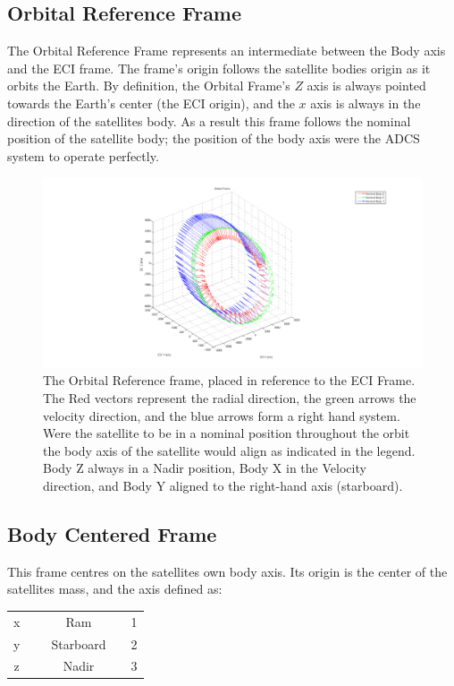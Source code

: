 \documentclass[12pt,a4paper]{article}
\begin{document}
\subsection{Orbital Reference Frame}
The Orbital Reference Frame represents an intermediate between the Body axis and the ECI frame. The frame's origin follows the satellite bodies origin as it orbits the Earth. By definition, the Orbital Frame's $Z$ axis is always pointed towards the Earth's center (the ECI origin), and the $x$ axis is always in the direction of the satellites body. As a result this frame follows the nominal position of the satellite body; the position of the body axis were the ADCS system to operate perfectly.

\begin{figure}[h!]
	\includegraphics[scale=0.25]{OrbitalFrame.png}
	\caption{The Orbital Reference frame, placed in reference to the ECI Frame. The Red vectors represent the radial direction, the green arrows the velocity direction, and the blue arrows form a right hand system. Were the satellite to be in a nominal position throughout the orbit the body axis of the satellite would align as indicated in the legend. Body Z always in a Nadir position, Body X in the Velocity direction, and Body Y aligned to the right-hand axis (starboard).}
\end{figure}

\subsection{Body Centered Frame}
This frame centres on the satellites own body axis. Its origin is the center of the satellites mass, and the axis defined as:\\
\begin{center}

\begin{tabular}{c c c c c}
x &~& Ram && 1\\
y &~& Starboard && 2\\
z &~& Nadir && 3\\
\end{tabular}
\end{center}
\end{document}

